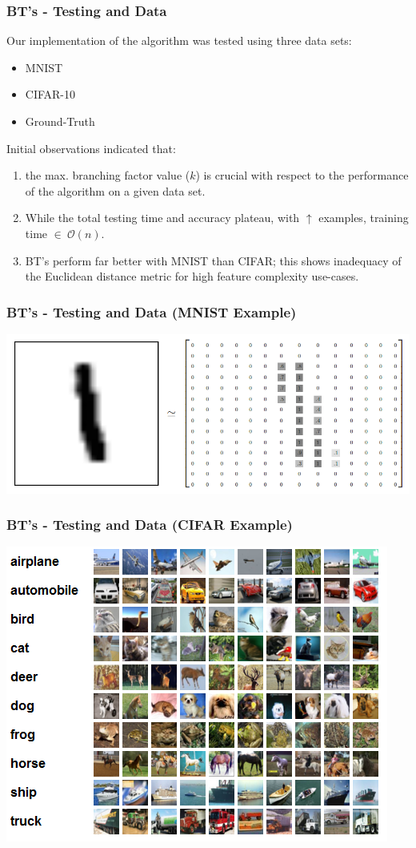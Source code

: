 \documentclass[pdf]{beamer}
\begin{document}
	\begin{frame}
		\frametitle{BT's - Testing and Data}
		Our implementation of the algorithm was tested using three data sets:
		\begin{itemize}
			\item MNIST\\
			\item CIFAR-10\\
			\item Ground-Truth\\
		\end{itemize}
		Initial observations indicated that:\\
		\begin{enumerate}
		 	\item the max. branching factor value ($k$) is crucial with respect to the performance of the algorithm on a given data set.\\
		 	\item While the total testing time and accuracy plateau, with $\uparrow$ examples, training time $\in\ \mathcal{O}\left(n\right)$.
		 	\item BT's perform far better with MNIST than CIFAR; this shows inadequacy of the Euclidean distance metric for high feature complexity use-cases.
		 \end{enumerate}
	\end{frame}
\begin{frame}
\frametitle{BT's - Testing and Data (MNIST Example)}
	\includegraphics[scale=0.3]{./Graphics/MNIST-Matrix}
\end{frame}
\begin{frame}
\frametitle{BT's - Testing and Data (CIFAR Example)}
\includegraphics[scale=0.7]{./Graphics/cifar_preview}
\end{frame}
\end{document}
